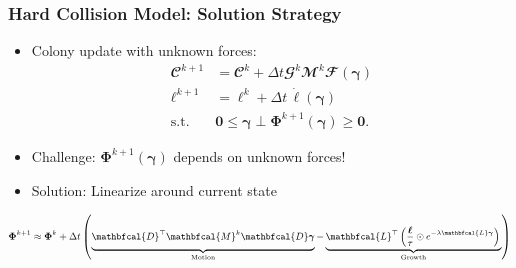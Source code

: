 \documentclass[
	10pt,
	t
]{beamer}
\begin{document}
\begin{frame}
    \frametitle{Hard Collision Model: Solution Strategy}
    \begin{itemize}
        \item Colony update with unknown forces:
              \begin{equation}
                  \begin{split}
                      \mathbfcal{C}^{k+1} & = \mathbfcal{C}^k + \Delta t \mathbfcal{G}^k \mathbfcal{M}^k \mathbfcal{F}(\boldsymbol{\gamma})  \\
                      \boldsymbol{\ell}^{k+1} & = \boldsymbol{\ell}^k + \Delta t \, \dot{\boldsymbol{\ell}}(\boldsymbol{\gamma}) \\
                      \text{s.t.} \quad & \mathbf{0} \leq \boldsymbol{\gamma} \perp \boldsymbol{\Phi}^{k+1}(\boldsymbol{\gamma}) \geq \mathbf{0}.
                  \end{split}
              \end{equation}
        \item Challenge: $\boldsymbol{\Phi}^{k+1}(\boldsymbol{\gamma})$ depends on unknown forces!
        \item Solution: Linearize around current state
    \end{itemize}

    \begin{equation*}
        \small
        \boldsymbol{\Phi}^{k+1} \approx \boldsymbol{\Phi}^k + \Delta t
        \left(
        \underbrace{\mathbfcal{D}^\top \mathbfcal{M}^k \mathbfcal{D} \boldsymbol{\gamma} \vphantom{\mathbfcal{L}^\top \left(\frac{\boldsymbol{\ell}}{\tau} \odot e^{-\lambda \mathbfcal{L} \boldsymbol{\gamma}} \right)}}_{\text{Motion}}
        -
        \underbrace{\mathbfcal{L}^\top \left(\frac{\boldsymbol{\ell}}{\tau} \odot e^{-\lambda \mathbfcal{L} \boldsymbol{\gamma}} \right) \vphantom{\mathbfcal{D}^\top \mathbfcal{M}^k \mathbfcal{D} \boldsymbol{\gamma}}}_{\text{Growth}}
        \right)
    \end{equation*}

\end{frame}
\end{document}
